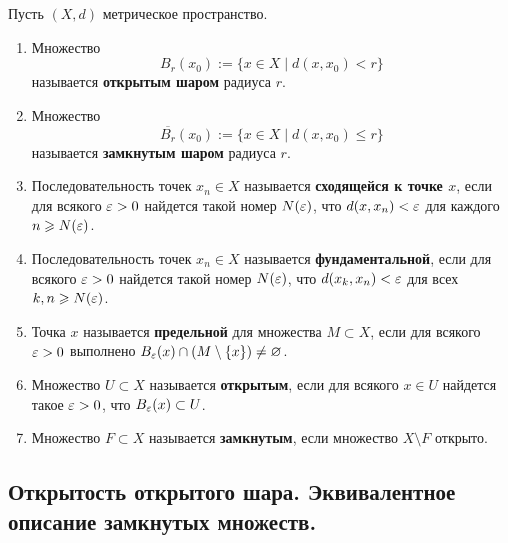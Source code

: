 \documentclass[a4paper]{article}
\theoremstyle{named}
\begin{document}
    \begin{definition*}
        Пусть $(X, d)$ метрическое пространство.
        \begin{enumerate}
        \item
            Множество 
            \begin{equation*}
                B_r(x_0) := \{x \in X \mid d(x, x_0) < r\}
            \end{equation*}
            называется \textbf{открытым шаром} радиуса $r$.

        \item
            Множество
            \begin{equation*}
                \overline{B_r}(x_0) := \{x \in X \mid d(x, x_0) \leq r\}
            \end{equation*}
            называется \textbf{замкнутым шаром} радиуса $r$.

        \item
            Последовательность точек $x_n \in X$ называется \textbf{сходящейся к точке $x$}, если для всякого $\varepsilon > 0$ найдется такой номер $N(\varepsilon)$, что $d(x, x_n) < \varepsilon$ для каждого $n \geqslant N(\varepsilon)$.

        \item
            Последовательность точек $x_n \in X$ называется \textbf{фундаментальной}, если для всякого $\varepsilon > 0$ найдется такой номер $N(\varepsilon)$, что $d(x_k, x_n) < \varepsilon$ для всех $k, n \geqslant N(\varepsilon)$.

        \item
            Точка $x$ называется \textbf{предельной} для множества $M \subset X$, если для всякого $\varepsilon > 0$ выполнено $B_{\varepsilon}(x) \cap (M \setminus \{x\}) \neq \varnothing$.

        \item
            Множество $U \subset X$ называется \textbf{открытым}, если для всякого $x \in U$ найдется такое $\varepsilon > 0$, что $B_{\varepsilon}(x) \subset U$.

        \item
            Множество $F \subset X$ называется \textbf{замкнутым}, если множество $X \setminus F$ открыто.
        \end{enumerate}
    \end{definition*}

    \subsection{Открытость открытого шара. Эквивалентное описание замкнутых множеств.}
\end{document}
